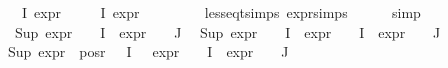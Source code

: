 \begin{isabellebody}
{\isachardoublequoteopen}{\isasymforall}{\isasymphi}{\isasymin}{\isasymPhi}\ {\isacharbackquote}{\kern0pt}\ I{\isachardot}{\kern0pt}\ expr{\isacharunderscore}{\kern0pt}{}\ {\isasymphi}\ {\isasymle}\ {}{\isachardoublequoteclose}\isanewline
{\isachardoublequoteopen}{\isasymforall}{\isasymphi}{\isasymin}{\isasymPhi}\ {\isacharbackquote}{\kern0pt}\ I{\isachardot}{\kern0pt}\ expr{\isacharunderscore}{\kern0pt}{}\ {\isasymphi}\ {\isasymle}\ {}{\isachardoublequoteclose}\isanewline
\ \ \ \ \isamarkupfalse%
\ less{\isacharunderscore}{\kern0pt}eq{\isacharunderscore}{\kern0pt}t{\isachardot}{\kern0pt}simps\ expr{\isachardot}{\kern0pt}simps\isanewline
\ \ \ \ \isamarkupfalse%
\ simp{\isacharplus}{\kern0pt}\isanewline
\ \ \isamarkupfalse%
\ {\isachardoublequoteopen}Sup\ {\isacharparenleft}{\kern0pt}{\isacharparenleft}{\kern0pt}expr{\isacharunderscore}{\kern0pt}{}\ {\isasymcirc}\ {\isasymPhi}{\isacharparenright}{\kern0pt}\ {\isacharbackquote}{\kern0pt}\ I\ {\isasymunion}\ {\isacharparenleft}{\kern0pt}expr{\isacharunderscore}{\kern0pt}{}\ {\isasymcirc}\ {\isasymPhi}{\isacharparenright}{\kern0pt}\ {\isacharbackquote}{\kern0pt}\ J{\isacharparenright}{\kern0pt}\ {\isasymle}\ {}{\isachardoublequoteclose}\isanewline
{\isachardoublequoteopen}{\isacharparenleft}{\kern0pt}Sup\ {\isacharparenleft}{\kern0pt}{\isacharparenleft}{\kern0pt}expr{\isacharunderscore}{\kern0pt}{}\ {\isasymcirc}\ {\isasymPhi}{\isacharparenright}{\kern0pt}\ {\isacharbackquote}{\kern0pt}\ I\ {\isasymunion}\ {\isacharparenleft}{\kern0pt}expr{\isacharunderscore}{\kern0pt}{}\ {\isasymcirc}\ {\isasymPhi}{\isacharparenright}{\kern0pt}\ {\isacharbackquote}{\kern0pt}\ I\ {\isasymunion}\ {\isacharparenleft}{\kern0pt}expr{\isacharunderscore}{\kern0pt}{}\ {\isasymcirc}\ {\isasymPhi}{\isacharparenright}{\kern0pt}\ {\isacharbackquote}{\kern0pt}\ J{\isacharparenright}{\kern0pt}{\isacharparenright}{\kern0pt}\ {\isasymle}\ {}{\isachardoublequoteclose}\isanewline
{\isachardoublequoteopen}Sup\ {\isacharparenleft}{\kern0pt}{\isacharparenleft}{\kern0pt}expr{\isacharunderscore}{\kern0pt}{}\ {\isacharbackquote}{\kern0pt}\ {\isacharparenleft}{\kern0pt}pos{\isacharunderscore}{\kern0pt}r\ {\isacharparenleft}{\kern0pt}{\isasymPhi}\ {\isacharbackquote}{\kern0pt}\ I{\isacharparenright}{\kern0pt}{\isacharparenright}{\kern0pt}{\isacharparenright}{\kern0pt}\ \ {\isasymunion}\ {\isacharparenleft}{\kern0pt}expr{\isacharunderscore}{\kern0pt}{}\ {\isasymcirc}\ {\isasymPhi}{\isacharparenright}{\kern0pt}\ {\isacharbackquote}{\kern0pt}\ I\ {\isasymunion}\ {\isacharparenleft}{\kern0pt}expr{\isacharunderscore}{\kern0pt}{}\ {\isasymcirc}\ {\isasymPhi}{\isacharparenright}{\kern0pt}\ {\isacharbackquote}{\kern0pt}\ J{\isacharparenright}{\kern0pt}\ {\isasymle}\ {}{\isachardoublequoteclose}\isanewline

\end{isabellebody}
